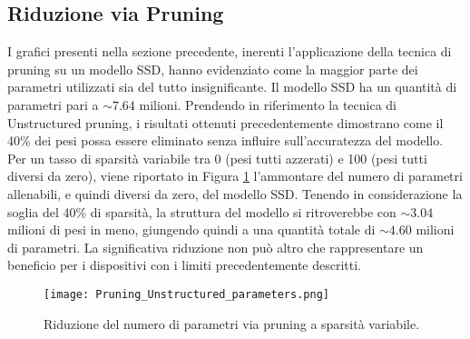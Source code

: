 \subsection{Riduzione via Pruning}
I grafici presenti nella sezione precedente, inerenti l'applicazione della tecnica 
di pruning su un modello SSD, hanno evidenziato come la maggior parte dei 
parametri utilizzati sia del tutto insignificante. Il modello SSD ha un quantità 
di parametri pari a $\sim{7.64}$ milioni. Prendendo in riferimento la tecnica 
di Unstructured pruning, i risultati ottenuti precedentemente dimostrano 
come il 40\% dei pesi possa essere eliminato senza influire sull'accuratezza 
del modello. Per un tasso di sparsità variabile tra 0 (pesi tutti azzerati) e 
100 (pesi tutti diversi da zero), viene riportato in Figura \ref{par_pruning} l'ammontare 
del numero di parametri allenabili, e quindi diversi da zero, del modello 
SSD. Tenendo in considerazione la soglia del 40\% di sparsità, la struttura 
del modello si ritroverebbe con $\sim{3.04}$ milioni di pesi in meno, giungendo 
quindi a una quantità totale di $\sim{4.60}$ milioni di parametri. La significativa 
riduzione non può altro che rappresentare un beneficio per i dispositivi con 
i limiti precedentemente descritti.
\begin{figure}
    \centering
    \texttt{[image: Pruning\_Unstructured\_parameters.png]}
    \centering
    \caption{Riduzione del numero di parametri via pruning a sparsità variabile.}
    \label{par_pruning}
\end{figure}

